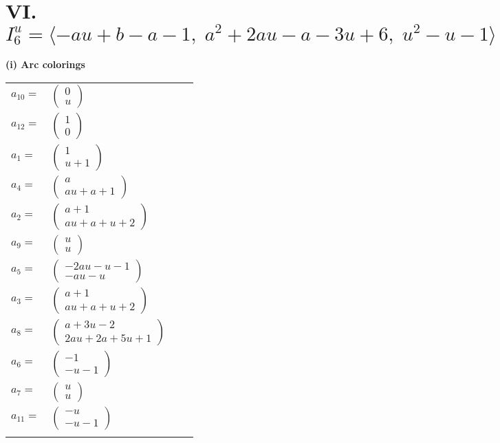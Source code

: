 \documentclass[1p]{elsarticle_modified}
\theoremstyle{definition}
\begin{document}
\centering \section*{VI. $I^u_{6}= \langle - a u+b- a-1,\;a^2+2 a u- a-3 u+6,\;u^2- u-1 \rangle$}
\flushleft \textbf{(i) Arc colorings}\\
\begin{tabular}{m{7pt} m{180pt} m{7pt} m{180pt} }
\flushright $a_{10}=$&$\begin{pmatrix}0\\u\end{pmatrix}$ \\
\flushright $a_{12}=$&$\begin{pmatrix}1\\0\end{pmatrix}$ \\
\flushright $a_{1}=$&$\begin{pmatrix}1\\u+1\end{pmatrix}$ \\
\flushright $a_{4}=$&$\begin{pmatrix}a\\a u+a+1\end{pmatrix}$ \\
\flushright $a_{2}=$&$\begin{pmatrix}a+1\\a u+a+u+2\end{pmatrix}$ \\
\flushright $a_{9}=$&$\begin{pmatrix}u\\u\end{pmatrix}$ \\
\flushright $a_{5}=$&$\begin{pmatrix}-2 a u- u-1\\- a u- u\end{pmatrix}$ \\
\flushright $a_{3}=$&$\begin{pmatrix}a+1\\a u+a+u+2\end{pmatrix}$ \\
\flushright $a_{8}=$&$\begin{pmatrix}a+3 u-2\\2 a u+2 a+5 u+1\end{pmatrix}$ \\
\flushright $a_{6}=$&$\begin{pmatrix}-1\\- u-1\end{pmatrix}$ \\
\flushright $a_{7}=$&$\begin{pmatrix}u\\u\end{pmatrix}$ \\
\flushright $a_{11}=$&$\begin{pmatrix}- u\\- u-1\end{pmatrix}$\\&\end{tabular}
\end{document}
